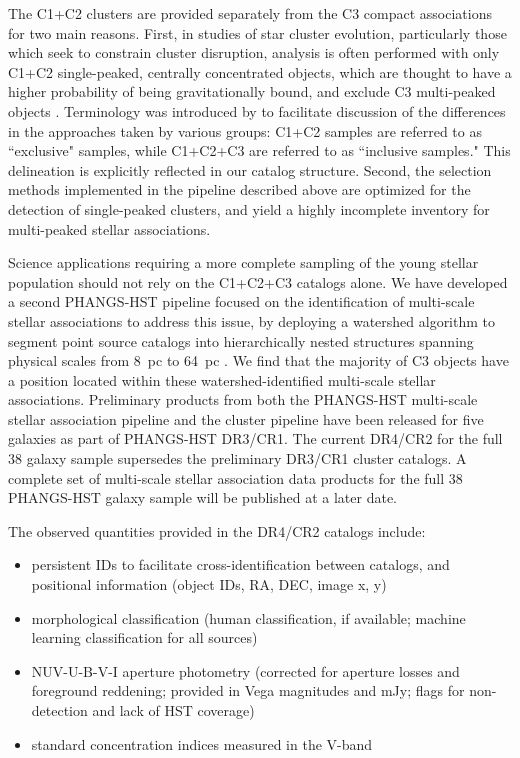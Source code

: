 \documentclass[linenumbers]{aastex63}
\begin{document}
The C1+C2 clusters are provided separately from the C3 compact associations for two main reasons.  First, in studies of star cluster evolution, particularly those which seek to constrain cluster disruption, analysis is often performed with only C1+C2 single-peaked, centrally concentrated objects, which are thought to have a higher probability of being gravitationally bound, and exclude C3 multi-peaked objects \citep{bastian_stellar_2012, chandar_star-cluster_2014}.  Terminology was introduced by \citet{krumholz_star_2019} to facilitate discussion of the differences in the approaches taken by various groups: C1+C2 samples are referred to as ``exclusive" samples, while C1+C2+C3 are referred to as ``inclusive samples."  This delineation is explicitly reflected in our catalog structure. Second, the selection methods implemented in the pipeline described above are optimized for the detection of single-peaked clusters, and yield a highly incomplete inventory for multi-peaked stellar associations.  

Science applications requiring a more complete sampling of the young stellar population should not rely on the C1+C2+C3 catalogs alone.  We have developed a second PHANGS-HST pipeline focused on the identification of multi-scale stellar associations to address this issue, by deploying a watershed algorithm to segment point source catalogs into hierarchically nested structures spanning physical scales from 8~pc to 64~pc \citep{larson_multi-scale_2022}.  We find that the majority of C3 objects have a position located within these watershed-identified multi-scale stellar associations. Preliminary products from both the PHANGS-HST multi-scale stellar association pipeline and the cluster pipeline have been released for five galaxies as part of PHANGS-HST DR3/CR1.  The current DR4/CR2 for the full 38 galaxy sample supersedes the preliminary DR3/CR1 cluster catalogs.  A complete set of multi-scale stellar association data products for the full 38 PHANGS-HST galaxy sample will be published at a later date. %

The observed quantities provided in the DR4/CR2 catalogs include:
\begin{itemize}
\item persistent IDs to facilitate cross-identification between catalogs, and positional information (object IDs, RA, DEC, image x, y)
\item morphological classification (human classification, if available; machine learning classification for all sources)
\item NUV-U-B-V-I aperture photometry (corrected for aperture losses and foreground reddening; provided in Vega magnitudes and mJy; flags for non-detection and lack of HST coverage)
\item standard concentration indices measured in the V-band
\end{itemize}
\end{document}
